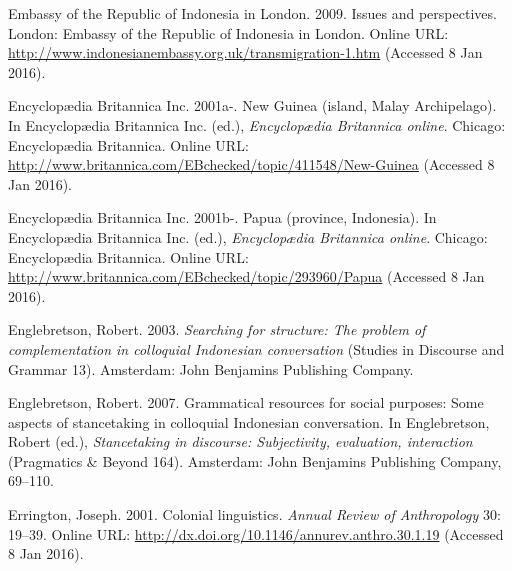 \begin{styleCitaviBibliographyEntry}
Embassy of the Republic of Indonesia in London. 2009. Issues and perspectives. London: Embassy of the Republic of Indonesia in London. Online URL: \url{http://www.indonesianembassy.org.uk/transmigration-1.htm} (Accessed 8 Jan 2016).
\end{styleCitaviBibliographyEntry}

\begin{styleCitaviBibliographyEntry}
Encyclopædia Britannica Inc. 2001a-. New Guinea (island, Malay Archipelago). In Encyclopædia Britannica Inc. (ed.), \textit{Encyclopædia Britannica online}. Chicago: Encyclopædia Britannica. Online URL: \url{http://www.britannica.com/EBchecked/topic/411548/New-Guinea} (Accessed 8 Jan 2016).
\end{styleCitaviBibliographyEntry}

\begin{styleCitaviBibliographyEntry}
Encyclopædia Britannica Inc. 2001b-. Papua (province, Indonesia). In Encyclopædia Britannica Inc. (ed.), \textit{Encyclopædia Britannica online}. Chicago: Encyclopædia Britannica. Online URL: \url{http://www.britannica.com/EBchecked/topic/293960/Papua} (Accessed 8 Jan 2016).
\end{styleCitaviBibliographyEntry}

\begin{styleCitaviBibliographyEntry}
Englebretson, Robert. 2003. \textit{Searching for structure: The problem of complementation in colloquial Indonesian conversation} (Studies in Discourse and Grammar 13). Amsterdam: John Benjamins Publishing Company.
\end{styleCitaviBibliographyEntry}

\begin{styleCitaviBibliographyEntry}
Englebretson, Robert. 2007. Grammatical resources for social purposes: Some aspects of stancetaking in colloquial Indonesian conversation. In Englebretson, Robert (ed.), \textit{Stancetaking in discourse: Subjectivity, evaluation, interaction} (Pragmatics \& Beyond 164). Amsterdam: John Benjamins Publishing Company, 69–110.
\end{styleCitaviBibliographyEntry}

\begin{styleCitaviBibliographyEntry}
Errington, Joseph. 2001. Colonial linguistics. \textit{Annual Review of Anthropology} 30: 19–39. Online URL: \url{http://dx.doi.org/10.1146/annurev.anthro.30.1.19} (Accessed 8 Jan 2016).
\end{styleCitaviBibliographyEntry}

